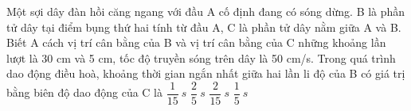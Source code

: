 \begin{vidu}%
 Một sợi dây đàn hồi căng ngang với đầu A cố định đang có sóng dừng. B là phần tử dây tại điểm bụng thứ hai tính từ đầu A, C là phần tử dây nằm giữa A và B. Biết A cách vị trí cân bằng của B và vị trí cân bằng của C những khoảng lần lượt là 30 cm và 5 cm, tốc độ truyền sóng trên dây là 50 cm/s. Trong quá trình dao động điều hoà, khoảng thời gian ngắn nhất giữa hai lần li độ của B có giá trị bằng biên độ dao động của C là
\choice
{$\dfrac{1}{15}\ s$}
{$\dfrac{2}{5}\ s$}
{$\dfrac{2}{15}\ s$}
{\True $\dfrac{1}{5}\ s$}
\end{vidu} %
 